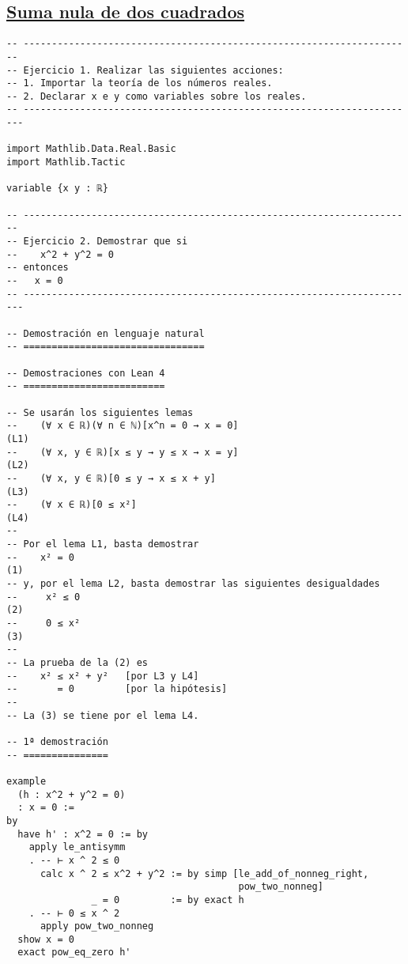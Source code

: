\subsection{\href{./src/Logica/Suma\_nula\_de\_dos\_cuadrados.lean}{Suma nula de dos cuadrados}}
\label{sec:org28f5127}
\begin{verbatim}
-- ---------------------------------------------------------------------
-- Ejercicio 1. Realizar las siguientes acciones:
-- 1. Importar la teoría de los números reales.
-- 2. Declarar x e y como variables sobre los reales.
-- ----------------------------------------------------------------------

import Mathlib.Data.Real.Basic
import Mathlib.Tactic

variable {x y : ℝ}

-- ---------------------------------------------------------------------
-- Ejercicio 2. Demostrar que si
--    x^2 + y^2 = 0
-- entonces
--   x = 0
-- ----------------------------------------------------------------------

-- Demostración en lenguaje natural
-- ================================

-- Demostraciones con Lean 4
-- =========================

-- Se usarán los siguientes lemas
--    (∀ x ∈ ℝ)(∀ n ∈ ℕ)[x^n = 0 → x = 0]                            (L1)
--    (∀ x, y ∈ ℝ)[x ≤ y → y ≤ x → x = y]                            (L2)
--    (∀ x, y ∈ ℝ)[0 ≤ y → x ≤ x + y]                                (L3)
--    (∀ x ∈ ℝ)[0 ≤ x²]                                              (L4)
--
-- Por el lema L1, basta demostrar
--    x² = 0                                                         (1)
-- y, por el lema L2, basta demostrar las siguientes desigualdades
--     x² ≤ 0                                                        (2)
--     0 ≤ x²                                                        (3)
--
-- La prueba de la (2) es
--    x² ≤ x² + y²   [por L3 y L4]
--       = 0         [por la hipótesis]
--
-- La (3) se tiene por el lema L4.

-- 1ª demostración
-- ===============

example
  (h : x^2 + y^2 = 0)
  : x = 0 :=
by
  have h' : x^2 = 0 := by
    apply le_antisymm
    . -- ⊢ x ^ 2 ≤ 0
      calc x ^ 2 ≤ x^2 + y^2 := by simp [le_add_of_nonneg_right,
                                         pow_two_nonneg]
               _ = 0         := by exact h
    . -- ⊢ 0 ≤ x ^ 2
      apply pow_two_nonneg
  show x = 0
  exact pow_eq_zero h'


\end{verbatim}
